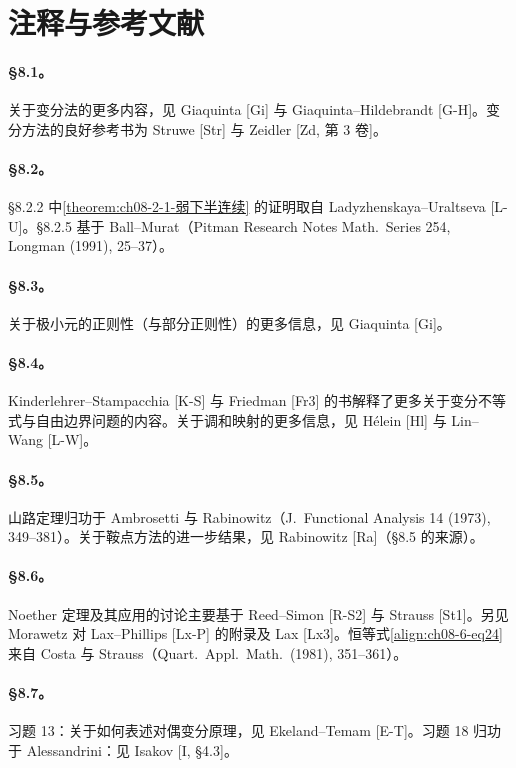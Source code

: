 \documentclass[../../main.tex]{subfiles}
\begin{document}
\section{注释与参考文献}\label{section:ch08-8-参考文献}

\paragraph{\S8.1。}关于变分法的更多内容，见 Giaquinta [Gi] 与 Giaquinta--Hildebrandt [G-H]。变分方法的良好参考书为 Struwe [Str] 与 Zeidler [Zd, 第 3 卷]。

\paragraph{\S8.2。}\S8.2.2 中\cref{theorem:ch08-2-1-弱下半连续} 的证明取自 Ladyzhenskaya--Uraltseva [L-U]。\S8.2.5 基于 Ball--Murat（Pitman Research Notes Math.\ Series 254, Longman (1991), 25--37）。

\paragraph{\S8.3。}关于极小元的正则性（与部分正则性）的更多信息，见 Giaquinta [Gi]。

\paragraph{\S8.4。}Kinderlehrer--Stampacchia [K-S] 与 Friedman [Fr3] 的书解释了更多关于变分不等式与自由边界问题的内容。关于调和映射的更多信息，见 Hélein [Hl] 与 Lin--Wang [L-W]。

\paragraph{\S8.5。}山路定理归功于 Ambrosetti 与 Rabinowitz（J.\ Functional Analysis 14 (1973), 349--381）。关于鞍点方法的进一步结果，见 Rabinowitz [Ra]（\S8.5 的来源）。

\paragraph{\S8.6。}Noether 定理及其应用的讨论主要基于 Reed--Simon [R-S2] 与 Strauss [St1]。另见 Morawetz 对 Lax--Phillips [Lx-P] 的附录及 Lax [Lx3]。恒等式\eqref{align:ch08-6-eq24} 来自 Costa 与 Strauss（Quart.\ Appl.\ Math.\ (1981), 351--361）。

\paragraph{\S8.7。}习题 13：关于如何表述对偶变分原理，见 Ekeland--Temam [E-T]。习题 18 归功于 Alessandrini：见 Isakov [I, \S4.3]。
\end{document}
